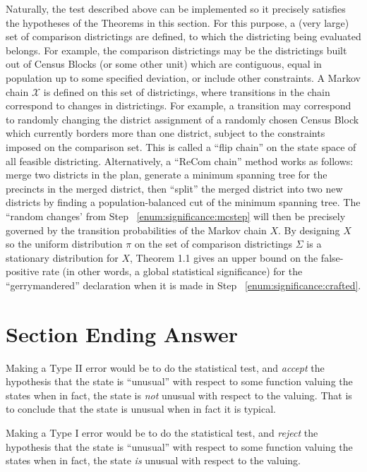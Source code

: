 \documentclass[12pt]{article}
\begin{document}
Naturally, the test described above can be implemented so it precisely
satisfies the hypotheses of the Theorems in this section.  For this
purpose, a (very large) set of comparison districtings are defined, to
which the districting being evaluated belongs.  For example, the
comparison districtings may be the districtings built out of Census
Blocks (or some other unit) which are contiguous, equal in population up
to some specified deviation, or include other constraints.  A Markov
chain \( \mathcal{X} \) is defined on this set of districtings, where
transitions in the chain correspond to changes in districtings.  For
example, a transition may correspond to randomly changing the district
assignment of a randomly chosen Census Block which currently borders
more than one district, subject to the constraints imposed on the
comparison set.  This is called a ``flip chain'' on the state space of all
feasible districting.  Alternatively, a ``ReCom chain'' method works as
follows:  merge two districts in the plan, generate a minimum spanning
tree for the precincts in the merged district, then ``split'' the merged
district into two new districts by finding a population-balanced cut of
the minimum spanning tree.  The ``random changes' from Step~%
\ref{enum:significance:mcstep} will then be precisely governed by the
transition probabilities of the Markov chain \( X \).  By designing \( X
\) so the uniform distribution \( \pi \) on the set of comparison
districtings \( \Sigma \) is a stationary distribution for \( X \),
Theorem 1.1 gives an upper bound on the false-positive rate (in other
words, a global statistical significance) for the ``gerrymandered''
declaration when it is made in Step~%
\ref{enum:significance:crafted}.

\section*{Section Ending Answer}

Making a Type II error would be to do the statistical test, and \emph{accept}
the hypothesis that the state is ``unusual'' with respect to some
function valuing the states when in fact, the state is \emph{not}
unusual with respect to the valuing.  That is to conclude that the state
is unusual when in fact it is typical.

Making a Type I error would be to do the statistical test, and \emph{reject}
the hypothesis that the state is ``unusual'' with respect to some
function valuing the states when in fact, the state \emph{is} unusual
with respect to the valuing.
\end{document}
